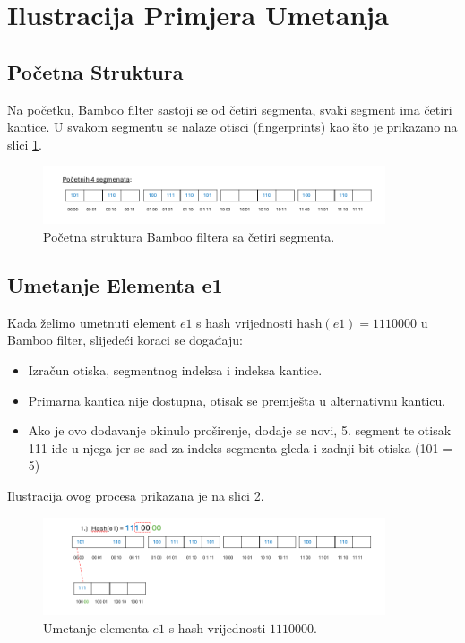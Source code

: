 \documentclass[seminarskirad]{fer}
\begin{document}
	
	\section{Ilustracija Primjera Umetanja}
	\subsection{Početna Struktura}
	Na početku, Bamboo filter sastoji se od četiri segmenta, svaki segment ima četiri kantice. U svakom segmentu se nalaze otisci (fingerprints) kao što je prikazano na slici \ref{fig:initial_segments}.
	
	
	\begin{figure}[h]
		\centering
		\includegraphics[width=0.9\textwidth]{images/initial_segments.png}
		\caption{Početna struktura Bamboo filtera sa četiri segmenta.}
		\label{fig:initial_segments}
	\end{figure}
	
	\subsection{Umetanje Elementa e1}
	Kada želimo umetnuti element \( e1 \) s hash vrijednosti \( \text{hash}(e1) = 1110000 \) u Bamboo filter, slijedeći koraci se događaju:
	\begin{itemize}
		\item Izračun otiska, segmentnog indeksa i indeksa kantice.
		\item Primarna kantica nije dostupna, otisak se premješta u alternativnu kanticu.
		\item Ako je ovo dodavanje okinulo proširenje, dodaje se novi, 5. segment te otisak 111 ide u njega jer se sad za indeks segmenta gleda i zadnji bit otiska (101 = 5)
	\end{itemize}
	Ilustracija ovog procesa prikazana je na slici \ref{fig:insertion_e1}.
	
	\begin{figure}[h]
		\centering
		\includegraphics[width=0.9\textwidth]{images/umetanje_el1.png}
		\caption{Umetanje elementa \( e1 \) s hash vrijednosti \( 1110000 \).}
		\label{fig:insertion_e1}
	\end{figure}
	
\end{document}
